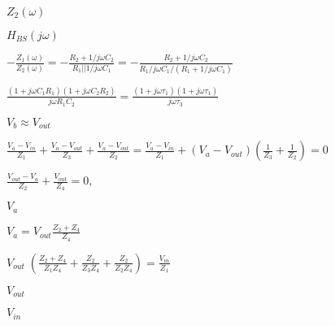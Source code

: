 \documentclass{article}
\def\lthtmlcheckvsize{\ifdim\ht\sizebox<\vsize 
  \ifdim\wd\sizebox<\hsize\expandafter\hfill\fi \expandafter\vfill
  \else\expandafter\vss\fi}%
\begin{document}
{\newpage\clearpage
{}%
$Z_2(\omega)$%
\lthtmlindisplaymathZ
\lthtmlcheckvsize\clearpage}

{\newpage\clearpage
{}%
$\displaystyle H_{BS}(j\omega)$%
\lthtmlindisplaymathZ
\lthtmlcheckvsize\clearpage}

{\newpage\clearpage
{}%
$\displaystyle -\frac{Z_1(\omega)}{Z_2(\omega)}
=-\frac{R_2+1/j\omega C_2}{R_1||1/j\omega C_1}
=-\frac{R_2+1/j\omega C_2}{R_1/j\omega C_1/(R_1+1/j\omega C_1)}$%
\lthtmlindisplaymathZ
\lthtmlcheckvsize\clearpage}

{\newpage\clearpage
{}%
$\displaystyle \frac{(1+j\omega C_1R_1)(1+j\omega C_2R_2)}{j\omega R_1C_2}
=\frac{(1+j\omega\tau_1)(1+j\omega\tau_1)}{j\omega\tau_3}$%
\lthtmlindisplaymathZ
\lthtmlcheckvsize\clearpage}

{\newpage\clearpage
{}%
$V_b\approx V_{out}$%
\lthtmlindisplaymathZ
\lthtmlcheckvsize\clearpage}

{\newpage\clearpage
{}%
$\displaystyle \frac{V_a-V_{in}}{Z_1}+\frac{V_a-V_{out}}{Z_3}+\frac{V_a-V_{out}}{Z_2}
  =\frac{V_a-V_{in}}{Z_1}+(V_a-V_{out})\left(\frac{1}{Z_3}+\frac{1}{Z_2}\right)=0 
$%
\lthtmlindisplaymathZ
\lthtmlcheckvsize\clearpage}

{\newpage\clearpage
{}%
$\displaystyle \frac{V_{out}-V_a}{Z_2}+\frac{V_{out}}{Z_4}=0,
$%
\lthtmlindisplaymathZ
\lthtmlcheckvsize\clearpage}

{\newpage\clearpage
{}%
$V_a$%
\lthtmlindisplaymathZ
\lthtmlcheckvsize\clearpage}

{\newpage\clearpage
{}%
$\displaystyle V_a=V_{out}\frac{Z_2+Z_4}{Z_4}
$%
\lthtmlindisplaymathZ
\lthtmlcheckvsize\clearpage}

{\newpage\clearpage
{}%
$\displaystyle V_{out}\;\left(\frac{Z_2+Z_4}{Z_1Z_4}+\frac{Z_2}{Z_3Z_4}+\frac{Z_2}{Z_2Z_4} \right)
  =\frac{V_{in}}{Z_1}
$%
\lthtmlindisplaymathZ
\lthtmlcheckvsize\clearpage}

{\newpage\clearpage
{}%
$V_{out}$%
\lthtmlindisplaymathZ
\lthtmlcheckvsize\clearpage}

{\newpage\clearpage
{}%
$V_{in}$%
\lthtmlindisplaymathZ
\lthtmlcheckvsize\clearpage}
\end{document}
